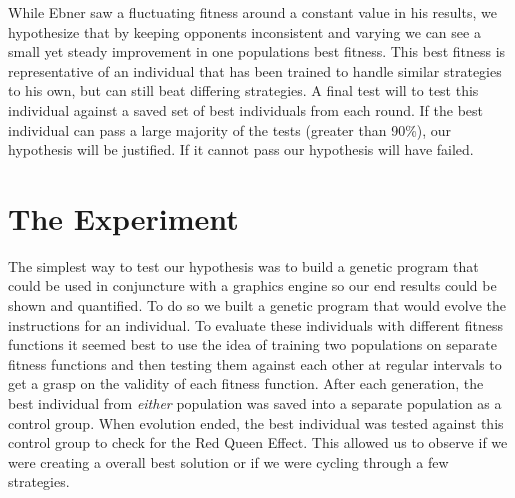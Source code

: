 \documentclass{acm_proc_article-sp}
\begin{document}
While Ebner saw a fluctuating fitness around a constant value in his results\cite{Ebner}, we hypothesize that by keeping opponents inconsistent and varying we can see a small yet steady improvement in one populations best fitness. This best fitness is representative of an individual that has been trained to handle similar strategies to his own, but can still beat differing strategies. A final test will to test this individual against a saved set of best individuals from each round. If the best individual can pass a large majority of the tests (greater than 90\%), our hypothesis will be justified. If it cannot pass our hypothesis will have failed.

\section{The Experiment} %

The simplest way to test our hypothesis was to build a genetic program that could be used in conjuncture with a graphics engine so our end results could be shown and quantified. To do so we built a genetic program that would evolve the instructions for an individual. To evaluate these individuals with different fitness functions it seemed best to use the idea of training two populations on separate fitness functions and then testing them against each other at regular intervals to get a grasp on the validity of each fitness function. After each generation, the best individual from \textit{either} population was saved into a separate population as a control group. When evolution ended, the best individual was tested against this control group to check for the Red Queen Effect. This allowed us to observe if we were creating a overall best solution or if we were cycling through a few strategies.
\end{document}
